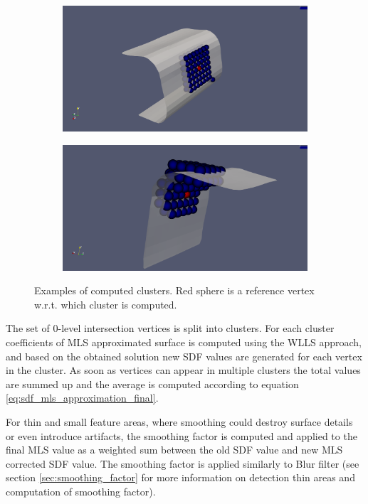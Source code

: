 \begin{figure}[H]
	\begin{center}
		\begin{subfigure}[b]{0.45\textwidth}
			\includegraphics[width=\textwidth]{figures/MlsCluster.png}
		\end{subfigure}
		\begin{subfigure}[b]{0.45\textwidth}
			\includegraphics[width=\textwidth]{figures/MlsCluster2.png}
		\end{subfigure}
	\end{center}
	\caption{Examples of computed clusters. Red sphere is a reference vertex w.r.t. which cluster is computed.}
	\label{fig:clusters}
\end{figure}

The set of 0-level intersection vertices is split into clusters. For each cluster coefficients of MLS approximated surface is computed using the WLLS approach, and based on the obtained solution new SDF values are generated for each vertex in the cluster. As soon as vertices can appear in multiple clusters the total values are summed up and the average is computed according to equation \ref{eq:sdf_mls_approximation_final}.


For thin and small feature areas, where smoothing could destroy surface details or even introduce artifacts, the smoothing factor is computed and applied to the final MLS value as a weighted sum between the old SDF value and new MLS corrected SDF value. The smoothing factor is applied similarly to Blur filter (see section \ref{sec:smoothing_factor} for more information on detection thin areas and computation of smoothing factor).



